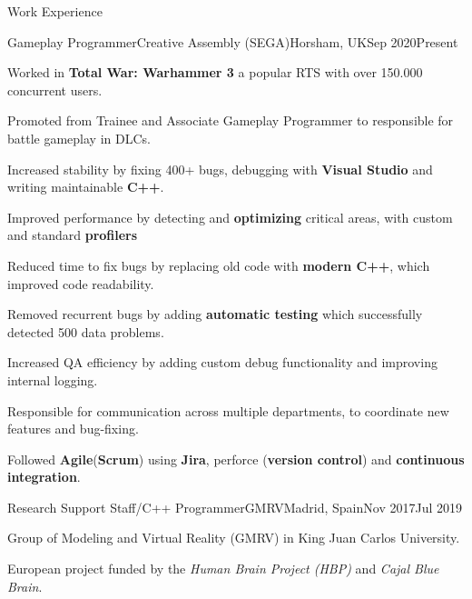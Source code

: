 \documentclass{resume} %
\begin{document}
\begin{mainSection}{Work Experience}
\begin{multiWorkExperience}
{Gameplay Programmer}{Creative Assembly (SEGA)}{Horsham, UK}{Sep 2020}{Present}
\item Worked in \textbf{Total War: Warhammer 3} a popular RTS with over 150.000 concurrent users.

\item Promoted from Trainee and Associate Gameplay Programmer to responsible for battle gameplay in DLCs.

\item Increased stability by fixing 400+ bugs, debugging with \textbf{Visual Studio} and writing maintainable \textbf{C++}.

\item Improved performance by detecting and \textbf{optimizing} critical areas, with custom and standard \textbf{profilers}

\item Reduced time to fix bugs by replacing old code with \textbf{modern C++}, which improved code readability.

\item Removed recurrent bugs by adding \textbf{automatic testing} which successfully detected 500 data problems.

\item Increased QA efficiency by adding custom debug functionality and improving internal logging.

\item Responsible for communication across multiple departments, to coordinate new features and bug-fixing.

\item Followed \textbf{Agile}(\textbf{Scrum}) using \textbf{Jira}, perforce (\textbf{version control}) and \textbf{continuous integration}.
\end{multiWorkExperience}
\begin{multiWorkExperience}
{Research Support Staff/C++ Programmer}{GMRV}{Madrid, Spain}{Nov 2017}{Jul 2019}

\item Group of Modeling and Virtual Reality (GMRV) in King Juan Carlos University.

\item European project funded by the \textit{Human Brain Project (HBP)} and \textit{Cajal Blue Brain}.


\end{multiWorkExperience}
\end{mainSection}
\end{document}
